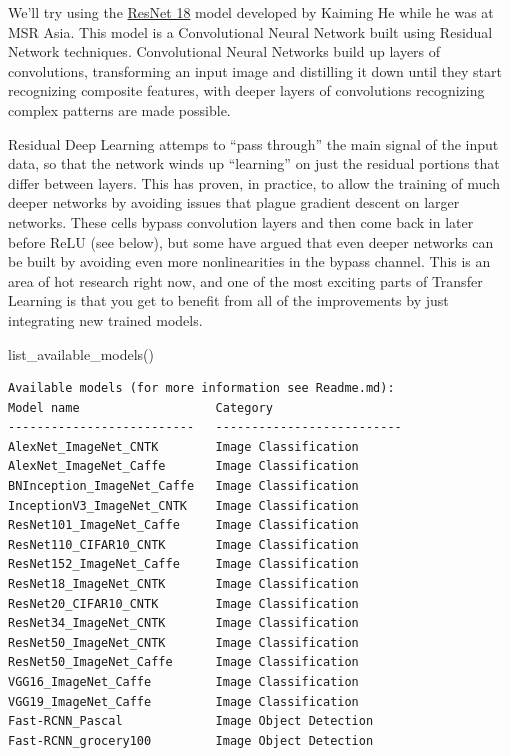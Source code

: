 \documentclass[]{book}
\newenvironment{Shaded}{\begin{snugshade}}{\end{snugshade}}
\newcommand{\OperatorTok}[1]{\textcolor[rgb]{0.81,0.36,0.00}{\textbf{#1}}}
\newcommand{\NormalTok}[1]{#1}
\theoremstyle{definition}
\theoremstyle{definition}
\theoremstyle{definition}
\theoremstyle{remark}
\begin{document}
We'll try using the \href{}{ResNet 18} model developed by Kaiming He
while he was at MSR Asia. This model is a Convolutional Neural Network
built using Residual Network techniques. Convolutional Neural Networks
build up layers of convolutions, transforming an input image and
distilling it down until they start recognizing composite features, with
deeper layers of convolutions recognizing complex patterns are made
possible.

Residual Deep Learning attemps to ``pass through'' the main signal of
the input data, so that the network winds up ``learning'' on just the
residual portions that differ between layers. This has proven, in
practice, to allow the training of much deeper networks by avoiding
issues that plague gradient descent on larger networks. These cells
bypass convolution layers and then come back in later before ReLU (see
below), but some have argued that even deeper networks can be built by
avoiding even more nonlinearities in the bypass channel. This is an area
of hot research right now, and one of the most exciting parts of
Transfer Learning is that you get to benefit from all of the
improvements by just integrating new trained models.

\begin{Shaded}
\begin{Highlighting}[]
\OperatorTok{%
\end{Highlighting}
\end{Shaded}

\begin{Shaded}
\begin{Highlighting}[]
\NormalTok{list_available_models()}
\end{Highlighting}
\end{Shaded}

\begin{verbatim}
Available models (for more information see Readme.md):
Model name                   Category
--------------------------   --------------------------
AlexNet_ImageNet_CNTK        Image Classification
AlexNet_ImageNet_Caffe       Image Classification
BNInception_ImageNet_Caffe   Image Classification
InceptionV3_ImageNet_CNTK    Image Classification
ResNet101_ImageNet_Caffe     Image Classification
ResNet110_CIFAR10_CNTK       Image Classification
ResNet152_ImageNet_Caffe     Image Classification
ResNet18_ImageNet_CNTK       Image Classification
ResNet20_CIFAR10_CNTK        Image Classification
ResNet34_ImageNet_CNTK       Image Classification
ResNet50_ImageNet_CNTK       Image Classification
ResNet50_ImageNet_Caffe      Image Classification
VGG16_ImageNet_Caffe         Image Classification
VGG19_ImageNet_Caffe         Image Classification
Fast-RCNN_Pascal             Image Object Detection
Fast-RCNN_grocery100         Image Object Detection
\end{verbatim}
\end{document}
